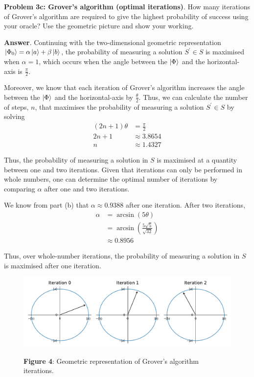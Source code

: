\textbf{Problem 3c: Grover's algorithm (optimal iterations)}. How many iterations of Grover's algorithm are required to give the highest probability of success using your oracle? 
Use the geometric picture and show your working.


\textbf{Answer}. Continuing with the two-dimensional geometric representation $\ket{\Phi_0} = \alpha \ket{a} + \beta \ket{b}$, 
the probability of measuring a solution $S^\prime \in S$ is maximised when $\alpha=1$, which occurs when the angle between the $\ket{\Phi}$ and the horizontal-axis is $\frac{\pi}{2}$.

Moreover, we know that each iteration of Grover's algorithm increases the angle between the $\ket{\Phi}$ and the horizontal-axis by $\frac{\theta}{2}$.
Thus, we can calculate the number of steps, $n$, that maximises the probability of measuring a solution $S^\prime \in S$ by solving
\begin{align*}
	(2n + 1)\theta &= \frac{\pi}{2} \\
	2n + 1 &\approx 3.8654 \\
	n &\approx 1.4327
\end{align*} 

Thus, the probability of measuring a solution in $S$ is maximised at a quantity between one and two iterations. 
Given that iterations can only be performed in whole numbers, one can determine the optimal number of iterations by comparing $\alpha$ after one and two iterations.

We know from part (b) that $\alpha \approx 0.9388$ after one iteration.
After two iterations,
\begin{align*}
	\alpha &= \arcsin(5\theta) \\
	&= \arcsin(\frac{5\sqrt{5}}{\sqrt{32}}) \\
	&\approx 0.8956
\end{align*}

Thus, over whole-number iterations, the probability of measuring a solution in $S$ is maximised after one iteration.

\begin{figure}[H]
	\captionlistentry{}
	\label{fig:geometric-grovers}
	\begin{center}
	\includegraphics[width=0.85\linewidth]{graphics/q3c.pdf}
	\end{center}
    \textsf{\footnotesize{\textbf{Figure 4}: Geometric representation of Grover's algorithm iterations.}}
\end{figure}

